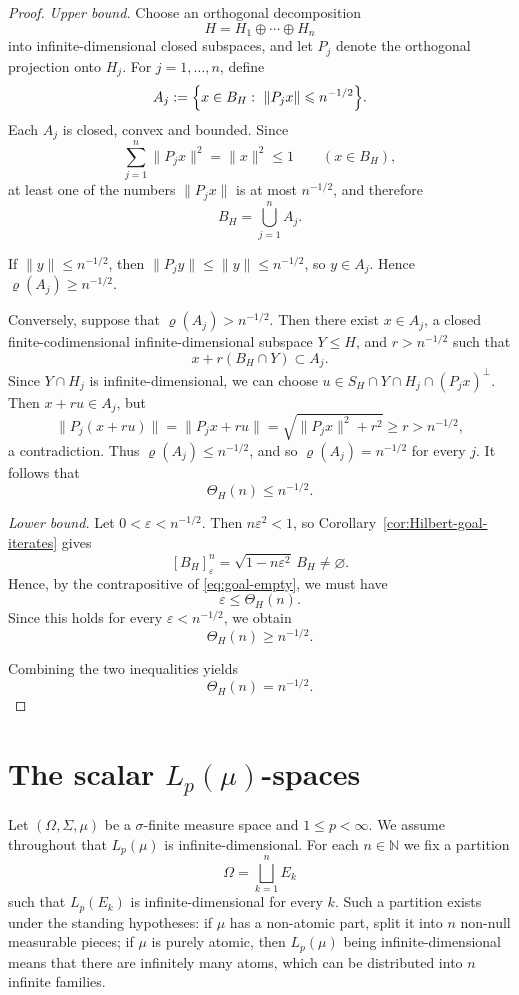 \documentclass[reqno,11pt]{amsart}
\theoremstyle{plain}
\theoremstyle{definition}
\theoremstyle{remark}
\renewcommand{\le}{\leqslant}
\renewcommand{\ge}{\geqslant}
\begin{document}
\begin{proof}
\emph{Upper bound.}
Choose an orthogonal decomposition
\[
H=H_1\oplus\cdots\oplus H_n
\]
into infinite-dimensional closed subspaces, and let $P_j$ denote the orthogonal
projection onto $H_j$.  For $j=1,\dots,n$, define
\[
A_j:=\Bigl\{x\in B_H:\ \|P_jx\|\le n^{-1/2}\Bigr\}.
\]
Each $A_j$ is closed, convex and bounded.  Since
\[
\sum_{j=1}^n \|P_jx\|^2=\|x\|^2\le1
\qquad(x\in B_H),
\]
at least one of the numbers $\|P_jx\|$ is at most $n^{-1/2}$, and therefore
\[
B_H=\bigcup_{j=1}^n A_j.
\]

If $\|y\|\le n^{-1/2}$, then $\|P_jy\|\le \|y\|\le n^{-1/2}$, so
$y\in A_j$. Hence $\varrho(A_j)\ge n^{-1/2}$.

Conversely, suppose that $\varrho(A_j)>n^{-1/2}$. Then there exist
$x\in A_j$, a closed finite-codimensional infinite-dimensional subspace
$Y\le H$, and $r>n^{-1/2}$ such that
\[
x+r(B_H\cap Y)\subset A_j.
\]
Since $Y\cap H_j$ is infinite-dimensional, we can choose
$u\in S_H\cap Y\cap H_j\cap (P_jx)^\perp$.  Then $x+ru\in A_j$, but
\[
\|P_j(x+ru)\|
=
\|P_jx+ru\|
=
\sqrt{\|P_jx\|^2+r^2}
\ge r>n^{-1/2},
\]
a contradiction.  Thus $\varrho(A_j)\le n^{-1/2}$, and so
$\varrho(A_j)=n^{-1/2}$ for every $j$.  It follows that
\[
\Theta_H(n)\le n^{-1/2}.
\]

\smallskip
\noindent\emph{Lower bound.}
Let $0<\varepsilon<n^{-1/2}$. Then $n\varepsilon^2<1$, so
Corollary~\ref{cor:Hilbert-goal-iterates} gives
\[
[B_H]^n_{\varepsilon}=\sqrt{1-n\varepsilon^2}\,B_H\neq\varnothing.
\]
Hence, by the contrapositive of \eqref{eq:goal-empty}, we must have
\[
\varepsilon\le \Theta_H(n).
\]
Since this holds for every $\varepsilon<n^{-1/2}$, we obtain
\[
\Theta_H(n)\ge n^{-1/2}.
\]

Combining the two inequalities yields
\[
\Theta_H(n)=n^{-1/2}.
\]
\end{proof}

\section{The scalar $L_p(\mu)$-spaces}\label{sec:Lp-mu}

Let $(\Omega,\Sigma,\mu)$ be a $\sigma$-finite measure space and
$1\le p<\infty$. We assume throughout that $L_p(\mu)$ is
infinite-dimensional. For each $n\in\mathbb N$ we fix a partition
\[
\Omega=\bigsqcup_{k=1}^n E_k
\]
such that $L_p(E_k)$ is infinite-dimensional for every $k$. Such a
partition exists under the standing hypotheses: if $\mu$ has a non-atomic
part, split it into $n$ non-null measurable pieces; if $\mu$ is purely
atomic, then $L_p(\mu)$ being infinite-dimensional means that there are
infinitely many atoms, which can be distributed into $n$ infinite families.
\end{document}
